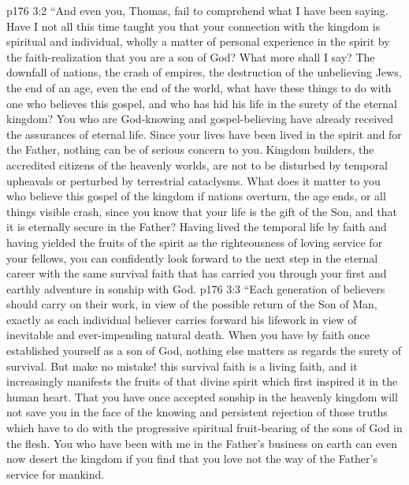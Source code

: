 \pc \vs p176 3:2 \textcolor{ubdarkred}{“And even you, Thomas, fail to comprehend what I have been saying. Have I not all this time taught you that your connection with the kingdom is spiritual and individual, wholly a matter of personal experience in the spirit by the faith\hyp{}realization that you are a son of God? What more shall I say? The downfall of nations, the crash of empires, the destruction of the unbelieving Jews, the end of an age, even the end of the world, what have these things to do with one who believes this gospel, and who has hid his life in the surety of the eternal kingdom? You who are God\hyp{}knowing and gospel\hyp{}believing have already received the assurances of eternal life. Since your lives have been lived in the spirit and for the Father, nothing can be of serious concern to you. Kingdom builders, the accredited citizens of the heavenly worlds, are not to be disturbed by temporal upheavals or perturbed by terrestrial cataclysms. What does it matter to you who believe this gospel of the kingdom if nations overturn, the age ends, or all things visible crash, since you know that your life is the gift of the Son, and that it is eternally secure in the Father? Having lived the temporal life by faith and having yielded the fruits of the spirit as the righteousness of loving service for your fellows, you can confidently look forward to the next step in the eternal career with the same survival faith that has carried you through your first and earthly adventure in sonship with God.}\plusone
\vs p176 3:3 \textcolor{ubdarkred}{“Each generation of believers should carry on their work, in view of the possible return of the Son of Man, exactly as each individual believer carries forward his lifework in view of inevitable and ever\hyp{}impending natural death. When you have by faith once established yourself as a son of God, nothing else matters as regards the surety of survival. But make no mistake! this survival faith is a living faith, and it increasingly manifests the fruits of that divine spirit which first inspired it in the human heart. That you have once accepted sonship in the heavenly kingdom will not save you in the face of the knowing and persistent rejection of those truths which have to do with the progressive spiritual fruit\hyp{}bearing of the sons of God in the flesh. You who have been with me in the Father’s business on earth can even now desert the kingdom if you find that you love not the way of the Father’s service for mankind.}
